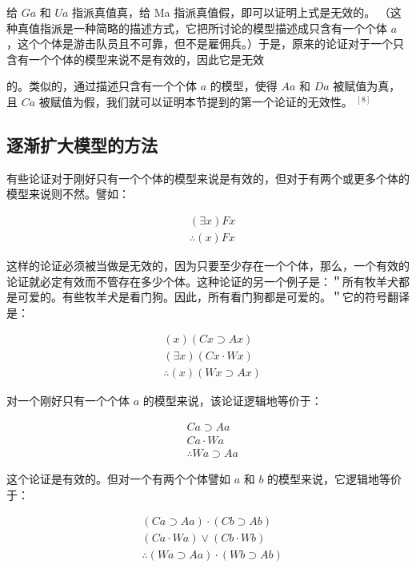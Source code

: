 给 $G a$ 和 $U a$ 指派真值真，给 Ma 指派真值假，即可以证明上式是无效的。 （这种真值指派是一种简略的描述方式，它把所讨论的模型描述成只含有一个个体 $a$ ，这个个体是游击队员且不可靠，但不是雇佣兵。）于是，原来的论证对于一个只含有一个个体的模型来说不是有效的，因此它是无效

的。类似的，通过描述只含有一个个体 $a$ 的模型，使得 $A a$ 和 $D a$ 被赋值为真，且 $C a$ 被赋值为假，我们就可以证明本节提到的第一个论证的无效性。 ${ }^{[8]}$

\subsection{逐渐扩大模型的方法}

有些论证对于刚好只有一个个体的模型来说是有效的，但对于有两个或更多个体的模型来说则不然。譬如：

$$
\begin{aligned}
& (\exists x) F x \\
& \therefore(x) F x
\end{aligned}
$$

这样的论证必须被当做是无效的，因为只要至少存在一个个体，那么，一个有效的论证就必定有效而不管存在多少个体。这种论证的另一个例子是：＂所有牧羊犬都是可爱的。有些牧羊犬是看门狗。因此，所有看门狗都是可爱的。＂它的符号翻译是：

$$
\begin{aligned}
& (x)(C x \supset A x) \\
& (\exists x)(C x \cdot W x) \\
& \therefore(x)(W x \supset A x)
\end{aligned}
$$

对一个刚好只有一个个体 $a$ 的模型来说，该论证逻辑地等价于：

$$
\begin{aligned}
& C a \supset A a \\
& C a \cdot W a \\
& \therefore W a \supset A a
\end{aligned}
$$

这个论证是有效的。但对一个有两个个体譬如 $a$ 和 $b$ 的模型来说，它逻辑地等价于：

$$
\begin{aligned}
& (C a \supset A a) \cdot(C b \supset A b) \\
& (C a \cdot W a) \vee(C b \cdot W b) \\
& \therefore(W a \supset A a) \cdot(W b \supset A b)
\end{aligned}
$$

